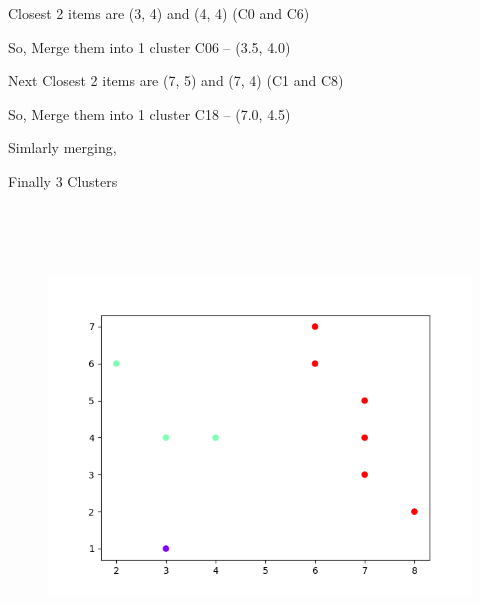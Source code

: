 \documentclass[12pt]{article}
\renewcommand{\_}{\kern-1.5pt\textunderscore\kern-1.5pt}
\begin{document}

\par

{\fontsize{14pt}{16.8pt}\selectfont Closest 2 items are (3, 4) and (4, 4) (C0 and C6)\par}\par

{\fontsize{14pt}{16.8pt}\selectfont So, Merge them into 1 cluster C06 – (3.5, 4.0)\par}\par

{\fontsize{14pt}{16.8pt}\selectfont Next Closest 2 items are (7, 5) and (7, 4) (C1 and C8)\par}\par

{\fontsize{14pt}{16.8pt}\selectfont So, Merge them into 1 cluster C18 – (7.0, 4.5)\par}\par

{\fontsize{14pt}{16.8pt}\selectfont Simlarly merging, \par}\par

{\fontsize{14pt}{16.8pt}\selectfont Finally 3 Clusters\par}\par




\begin{figure}[H]
	\begin{Center}
		\includegraphics[width=6.4in,height=4.8in]{./media/image7.png}
	\end{Center}
\end{figure}
\end{document}
